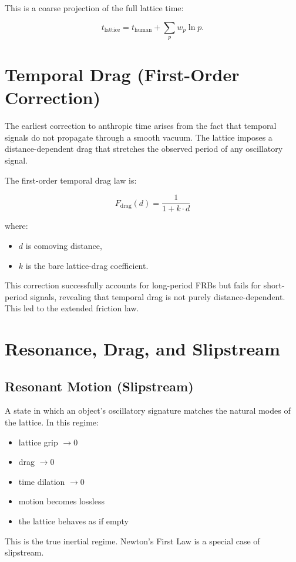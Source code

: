 \documentclass[12pt,oneside]{book}
\begin{document}
This is a coarse projection of the full lattice time:


\[
t_{\text{lattice}} = t_{\text{human}} + \sum_{p} w_p \ln p.
\]

\section{Temporal Drag (First-Order Correction)}

The earliest correction to anthropic time arises from the fact that temporal signals do not 
propagate through a smooth vacuum. The lattice imposes a distance-dependent drag that stretches 
the observed period of any oscillatory signal.

The first-order temporal drag law is:

\begin{equation}
F_{\text{drag}}(d) = \frac{1}{1 + k \cdot d}
\end{equation}

where:
\begin{itemize}
    \item $d$ is comoving distance,
    \item $k$ is the bare lattice-drag coefficient.
\end{itemize}

This correction successfully accounts for long-period FRBs but fails for short-period signals, 
revealing that temporal drag is not purely distance-dependent. This led to the extended friction law.


\section{Resonance, Drag, and Slipstream}

\subsection{Resonant Motion (Slipstream)}
A state in which an object's oscillatory signature matches the natural modes of the lattice.  
In this regime:
\begin{itemize}
    \item lattice grip $\rightarrow 0$
    \item drag $\rightarrow 0$
    \item time dilation $\rightarrow 0$
    \item motion becomes lossless
    \item the lattice behaves as if empty
\end{itemize}
This is the true inertial regime. Newton's First Law is a special case of slipstream.
\end{document}
